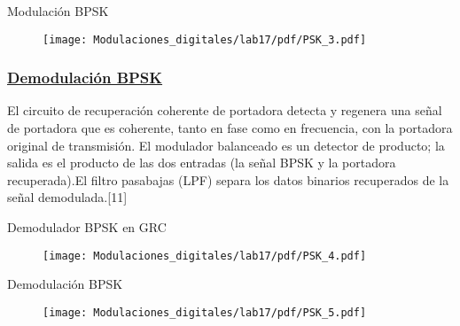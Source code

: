 \begin{frame}{Modulación BPSK}
\begin{figure}[H]
\vspace{-3mm}
\centering
\texttt{[image: Modulaciones\_digitales/lab17/pdf/PSK\_3.pdf]}
\end{figure}
\end{frame}
\begin{frame}


\frametitle{\underline{\textbf{Demodulación BPSK}}}

El circuito de recuperación coherente de portadora detecta y regenera una señal de portadora que es coherente, tanto en fase como en frecuencia, con la portadora original de transmisión. El modulador balanceado es un detector de producto; la salida es el producto de las dos entradas (la señal BPSK y la portadora recuperada).El filtro pasabajas (LPF) separa los datos binarios recuperados de la señal demodulada.[11]

\end{frame}
\begin{frame}{Demodulador BPSK en GRC}
\begin{figure}[H]
\vspace{-3mm}
\centering
\texttt{[image: Modulaciones\_digitales/lab17/pdf/PSK\_4.pdf]}
\end{figure}
\end{frame}
\begin{frame}{Demodulación BPSK}
\begin{figure}[H]
\vspace{-3mm}
\centering
\texttt{[image: Modulaciones\_digitales/lab17/pdf/PSK\_5.pdf]}
\end{figure}
\end{frame}